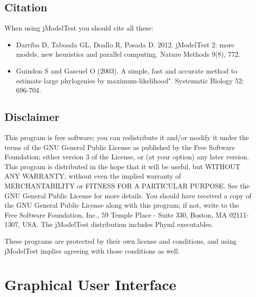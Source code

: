 \documentclass[10pt,twoside,a4paper]{article}
\begin{document}
\subsection{Citation}

When using jModelTest you should cite all these:

\begin{itemize}
\item Darriba D, Taboada GL, Doallo R, Posada D. 2012. jModelTest 2: more models, new heuristics and parallel computing. Nature Methods 9(8), 772.
\item Guindon S and Gascuel O (2003). A simple, fast and accurate method to estimate large phylogenies by maximum-likelihood". Systematic Biology 52: 696-704. 
\end{itemize}

\subsection{Disclaimer}

{\footnotesize
This program is free software; you can redistribute it and/or modify it under the terms of the GNU General Public License as published by the Free Software Foundation; either version 3 of the License, or (at your option) any later version. This program is distributed in the hope that it will be useful, but WITHOUT ANY WARRANTY; without even the implied warranty of MERCHANTABILITY or FITNESS FOR A PARTICULAR PURPOSE. See the GNU General Public License for more details. You should have received a copy of the GNU General Public License along with this program; if not, write to the Free Software Foundation, Inc., 59 Temple Place - Suite 330, Boston, MA 02111-1307, USA. The jModelTest distribution includes Phyml executables.

These programs are protected by their own license and conditions, and using jModelTest implies agreeing with those conditions as well. 
}


{\footnotesize

}





\section{Graphical User Interface}
\label{sec:gui}
\end{document}
